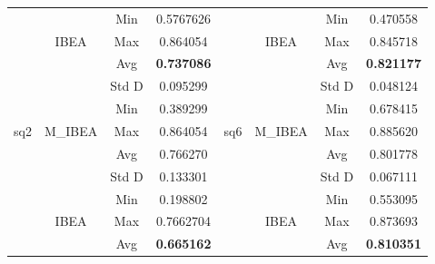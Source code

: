 \begin{table}[]
\begin{tabular}{cccccccc}
		&                           & Min        & 0.5767626         &                       &                                                   & Min        & 0.470558          \\ \cline{3-4} \cline{7-8} 
		& \multirow{-4}{*}{IBEA}    & Max        & 0.864054          &                       & \multirow{-4}{*}{IBEA}                            & Max        & 0.845718          \\ \cline{2-4} \cline{6-8} 
		&                           & Avg        & \textbf{0.737086} &                       & \cellcolor[HTML]{C0C0C0}                          & Avg        & \textbf{0.821177} \\ \cline{3-4} \cline{7-8} 
		&                           & Std D      & 0.095299          &                       & \cellcolor[HTML]{C0C0C0}                          & Std D      & 0.048124          \\ \cline{3-4} \cline{7-8} 
		&                           & Min        & 0.389299          &                       & \cellcolor[HTML]{C0C0C0}                          & Min        & 0.678415          \\ \cline{3-4} \cline{7-8} 
		\multirow{-8}{*}{sq2} & \multirow{-4}{*}{M\_IBEA} & Max        & 0.864054          & \multirow{-8}{*}{sq6} & \multirow{-4}{*}{\cellcolor[HTML]{C0C0C0}M\_IBEA} & Max        & 0.885620          \\ \hline
		&                           & Avg        & 0.766270          &                       &                                                   & Avg        & 0.801778          \\ \cline{3-4} \cline{7-8} 
		&                           & Std D      & 0.133301          &                       &                                                   & Std D      & 0.067111          \\ \cline{3-4} \cline{7-8} 
		&                           & Min        & 0.198802          &                       &                                                   & Min        & 0.553095          \\ \cline{3-4} \cline{7-8} 
		& \multirow{-4}{*}{IBEA}    & Max        & 0.7662704         &                       & \multirow{-4}{*}{IBEA}                            & Max        & 0.873693          \\ \cline{2-4} \cline{6-8} 
		&                           & Avg        & \textbf{0.665162} &                       &                                                   & Avg        & \textbf{0.810351} \\ \cline{3-4} \cline{7-8} 

\end{tabular}
\end{table}
